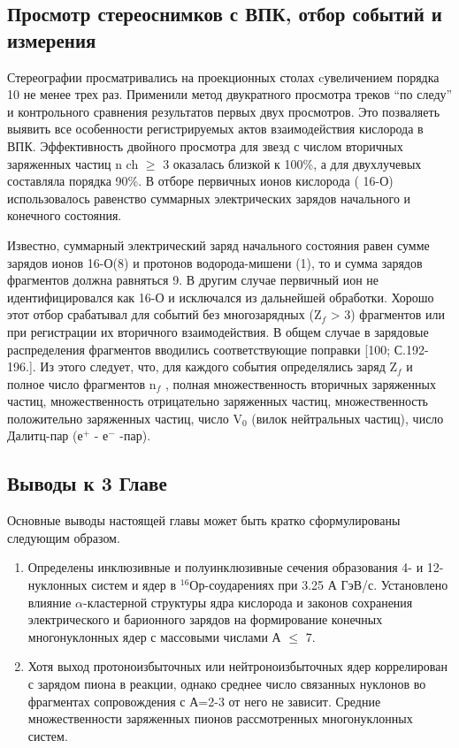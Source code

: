 \documentclass[fontsize=14pt]{scrarticle}
\begin{document}
\subsection{Просмотр стереоснимков с ВПК, отбор событий и измерения}
\hspace{0.6cm}
Стереографии просматривались на проекционных столах cувеличением
порядка 10 не менее трех раз. Применили метод двукратного просмотра
треков “по следу” и контрольного сравнения результатов первых двух
просмотров. Это позваляеть выявить все особенности регистрируемых актов взаимодействия кислорода в ВПК. Эффективность двойного просмотра для звезд с числом вторичных заряженных частиц n ch $\ge$ 3 оказалась близкой к 100\%, а для двухлучевых составляла порядка 90\%. В отборе первичных ионов кислорода ( 16-О) использовалось равенство суммарных электрических зарядов начального и конечного состояния.



Известно, суммарный электрический заряд начального состояния равен сумме зарядов ионов 16-О(8) и протонов водорода-мишени (1), то и сумма зарядов фрагментов должна равняться 9. В другим случае первичный ион не идентифицировался как 16-О и исключался из дальнейшей обработки. Хорошо этот отбор срабатывал для
событий без многозарядных (Z$_{f}$ > 3) фрагментов или при регистрации их вторичного взаимодействия. В общем случае в зарядовые распределения фрагментов вводились соответствующие поправки [100; С.192-196.]. Из этого следует, что, для каждого события определялись заряд Z$_{f}$ и полное число
фрагментов n$_{f}$ , полная множественность вторичных заряженных частиц, множественность отрицательно заряженных частиц, множественность положительно заряженных частиц, число V$_{0}$ (вилок
нейтральных частиц), число Далитц-пар (е$^{+}$ - е$^{-}$ -пар).
\subsection*{Выводы к 3 Главе}
Основные выводы настоящей главы может быть кратко сформулированы следующим образом.
\begin{enumerate}
    \item Определены инклюзивные и полуинклюзивные сечения образования 4- и 12-нуклонных систем и ядер в $^{16}$Ор-соударениях при 3.25 А ГэВ/с. Установлено влияние $\alpha$-кластерной структуры ядра кислорода и законов сохранения электрического и барионного зарядов на формирование конечных многонуклонных ядер с массовыми числами А $\le$ 7.
    \item Хотя выход протоноизбыточных или нейтроноизбыточных ядер коррелирован с зарядом пиона в реакции, однако среднее число связанных нуклонов во фрагментах сопровождения с А=2-3 от него не зависит. Средние множественности заряженных пионов рассмотренных многонуклонных систем.
\end{enumerate}
\end{document}
